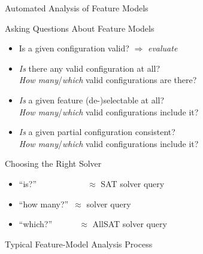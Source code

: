 \begin{frame}{Automated Analysis of Feature Models}
	\begin{fancycolumns}[widths={52}]
		\begin{example}{Asking Questions About Feature Models}
			\begin{itemize}
				\item Is a given configuration valid? $\Rightarrow$ \emph{evaluate}
				\item \emph{Is} there any valid configuration at all?\\
					\emph{How many}/\emph{which} valid configurations are there?\\
				\item \emph{Is} a given feature (de-)selectable at all?\\
					\emph{How many}/\emph{which} valid configurations include it?\\
				\item \emph{Is} a given partial configuration consistent?\\
					\emph{How many}/\emph{which} valid configurations include it?\\
			\end{itemize}
		\end{example}
		\begin{note}{Choosing the Right Solver}
			\begin{itemize}
				\item ``is?''~~~~~~~~~~~~$\approx$ SAT solver query
				\item ``how many?''~$\approx$ \ssat{} solver query
				\item ``which?''~~~~~~\,$\approx$ AllSAT solver query
			\end{itemize}
		\end{note}
	\nextcolumn
		\begin{definition}{Typical Feature-Model Analysis Process}
			\centering
\end{definition}
\end{fancycolumns}
\end{frame}
